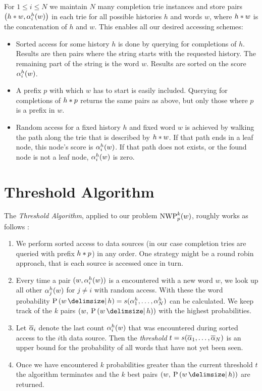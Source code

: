 For $1 \leq i \leq N$ we maintain $N$ many completion trie instances and store
pairs $\left(h * w, \alpha^h_i(w)\right)$ in each trie for all possible
histories $h$ and words $w$, where $h * w$ is the concatenation of
$h$ and $w$.
This enables all our desired accessing schemes:
\begin{itemize}
  \item Sorted access for some history $h$ is done by querying for completions
    of $h$.
    Results are then pairs where the string starts with the requested
    history.
    The remaining part of the string is the word $w$.
    Results are sorted on the score $\alpha^h_i(w)$.
  \item A prefix $p$ with which $w$ has to start is easily included.
    Querying for completions of $h * p$ returns the same pairs as above, but only
    those where $p$ is a prefix in $w$.
  \item Random access for a fixed history $h$ and fixed word $w$ is achieved by
    walking the path along the trie that is described by $h * w$.
    If that path ends in a leaf node, this node's score is $\alpha^h_i(w)$.
    If that path does not exists, or the found node is not a leaf node,
    $\alpha^h_i(w)$ is zero.
\end{itemize}

\section{Threshold Algorithm}
\label{sec:thresholdalgorithm}

The \emph{Threshold Algorithm}, applied to our problem $\NWP[p][k](w)$, roughly
works as follows \parencite{Fagin2001}:
\begin{enumerate}
  \item We perform sorted access to data sources (in our case completion tries
    are queried with prefix $h * p$) in any order.
    One strategy might be a round robin approach, that is each source is
    accessed once in turn.
  \item Every time a pair $(w, \alpha^h_i(w))$ is a encountered with a new word
    $w$, we look up all other $\alpha^h_j(w)$ for $j \neq i$ with random
    access.
    With these the word probability
    $\Prob{w}{h} = s(\SumArg^h_1, \ldots, \SumArg^h_N)$ can be calculated.
    We keep track of the $k$ pairs $(w, \: \Prob{w}{h})$ with the highest
    probabilities.
  \item Let $\overline{\alpha}_i$ denote the last count $\alpha^h_i(w)$ that
    was encountered during sorted access to the $i$th data source.
    Then the \emph{threshold}
    $t = s(\overline{\alpha}_1, \ldots, \overline{\alpha}_N)$
    is an upper bound for the probability of all words that have not yet been
    seen.
  \item Once we have encountered $k$ probabilities greater than the current
    threshold $t$ the algorithm terminates and the $k$ best pairs
    $(w, \: \Prob{w}{h})$ are returned.
\end{enumerate}

